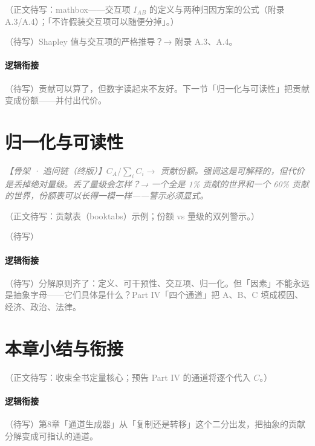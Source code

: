 \documentclass[../../main2.tex]{subfiles}
\begin{document}
	\textcolor{gray}{（正文待写：mathbox——交互项 $I_{AB}$ 的定义与两种归因方案的公式（附录 A.3/A.4）；「不许假装交互项可以随便分掉」。）}

	\begin{reader_anticipation}
		\item \textcolor{gray}{（待写）Shapley 值与交互项的严格推导？→ 附录 A.3、A.4。}
	\end{reader_anticipation}

	\paragraph*{逻辑衔接}
	\textcolor{gray}{（待写）贡献可以算了，但数字读起来不友好。下一节「归一化与可读性」把贡献变成份额——并付出代价。}

	\section{归一化与可读性}
	\label{sec:contrib-normalize}

	\textcolor{gray}{\textit{【骨架 · 追问链（终版）】$C_A / \sum_i C_i \to$ 贡献份额。强调这是可解释的，但代价是丢掉绝对量级。丢了量级会怎样？→ 一个全是 1\% 贡献的世界和一个 60\% 贡献的世界，份额表可以长得一模一样——警示必须显式。}}

	\textcolor{gray}{（正文待写：贡献表（booktabs）示例；份额 vs 量级的双列警示。）}

	\begin{readingnote}
		\textcolor{gray}{（待写）}
	\end{readingnote}

	\paragraph*{逻辑衔接}
	\textcolor{gray}{（待写）分解原则齐了：定义、可干预性、交互项、归一化。但「因素」不能永远是抽象字母——它们具体是什么？Part IV「四个通道」把 A、B、C 填成模因、经济、政治、法律。}

	\section{本章小结与衔接}
	\label{sec:contrib-summary}

	\textcolor{gray}{（正文待写：收束全书定量核心；预告 Part IV 的通道将逐个代入 $C$。）}

	\paragraph*{逻辑衔接}
	\textcolor{gray}{（待写）第8章「通道生成器」从「复制还是转移」这个二分出发，把抽象的贡献分解变成可指认的通道。}
\end{document}
